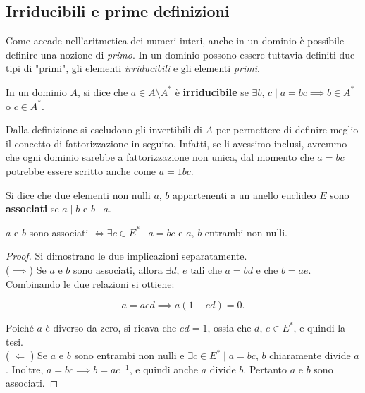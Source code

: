\subsection{Irriducibili e prime definizioni}

Come accade nell'aritmetica dei numeri interi, anche in un dominio è possibile definire
una nozione di \textit{primo}. In un dominio possono essere tuttavia definiti due tipi di "primi",
gli elementi \textit{irriducibili} e gli elementi \textit{primi}.

\begin{definition}
    In un dominio $A$, si dice che $a \in A \setminus A^*$ è \textbf{irriducibile} se
    $\exists b$, $c \mid a=bc \implies b \in A^*$ o $c \in A^*$.
\end{definition}

\begin{remark*}
    Dalla definizione si escludono gli invertibili di $A$ per permettere
    di definire meglio il concetto di fattorizzazione in seguito. Infatti,
    se li avessimo inclusi, avremmo che ogni dominio sarebbe a fattorizzazione
    non unica, dal momento che $a=bc$ potrebbe essere scritto anche come
    $a=1bc$.
\end{remark*}

\begin{definition}
    Si dice che due elementi non nulli $a$, $b$ appartenenti a un anello euclideo
    $E$ sono \textbf{associati} se $a \mid b$ e $b \mid a$.
\end{definition}

\begin{proposition}
    \label{prop:associati}
    $a$ e $b$ sono associati $\iff \exists c \in E^* \mid a=bc$ e $a$, $b$ entrambi non nulli.
\end{proposition}

\begin{proof} Si dimostrano le due implicazioni separatamente. \\

    ($\implies$) Se $a$ e $b$ sono associati, allora $\exists d$, $e$ tali che $a=bd$ e che $b=ae$. Combinando le due relazioni si ottiene:

    \[ a=aed \implies a(1-ed)=0.\]

    Poiché $a$ è diverso da zero, si ricava che $ed=1$, ossia
    che $d$, $e \in E^*$, e quindi la tesi. \\

    ($\;\Longleftarrow\;$) Se $a$ e $b$ sono entrambi non
    nulli e $\exists c \in E^* \mid a=bc$, $b$ chiaramente
    divide $a$. Inoltre, $a=bc \implies b=ac^{-1}$, e quindi
    anche $a$ divide $b$. Pertanto $a$ e $b$ sono associati.
\end{proof}

